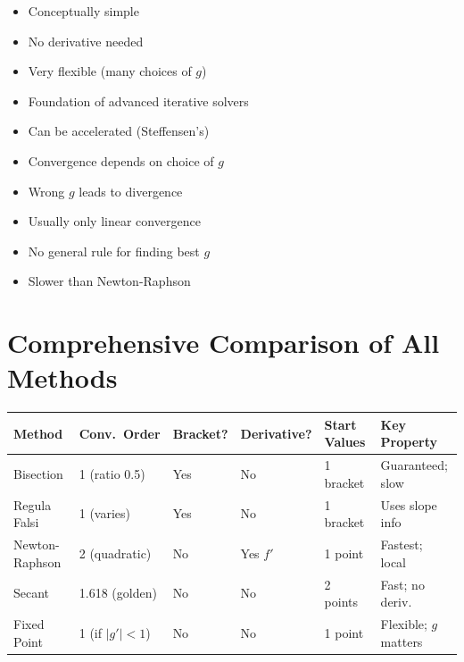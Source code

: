 \documentclass[12pt]{article}
\newcommand{\hcell}[1]{\textbf{\color{white}#1}}
\begin{document}
\bigskip

\begin{multicols}{2}
\begin{prosbox}
\begin{itemize}[noitemsep]
  \item Conceptually simple
  \item No derivative needed
  \item Very flexible (many choices of $g$)
  \item Foundation of advanced iterative solvers
  \item Can be accelerated (Steffensen's)
\end{itemize}
\end{prosbox}

\columnbreak

\begin{consbox}
\begin{itemize}[noitemsep]
  \item Convergence depends on choice of $g$
  \item Wrong $g$ leads to divergence
  \item Usually only linear convergence
  \item No general rule for finding best $g$
  \item Slower than Newton-Raphson
\end{itemize}
\end{consbox}
\end{multicols}

\newpage

\section*{Comprehensive Comparison of All Methods}

\begin{center}
{\footnotesize\setlength{\tabcolsep}{4pt}
\begin{tabular}{p{2.6cm} C{2.2cm} C{1.7cm} C{2cm} C{1.8cm} p{2.8cm}}
\toprule
{}
\hcell{Method} & \hcell{Conv.\ Order} & \hcell{Bracket?} & \hcell{Derivative?} & \hcell{Start Values} & \hcell{Key Property} \\
\midrule
{}
Bisection      & 1 (ratio 0.5)  & Yes & No       & 1 bracket & Guaranteed; slow \\
Regula Falsi   & 1 (varies)     & Yes & No       & 1 bracket & Uses slope info \\
Newton-Raphson & 2 (quadratic)  & No  & Yes $f'$ & 1 point   & Fastest; local \\
Secant         & 1.618 (golden) & No  & No       & 2 points  & Fast; no deriv. \\
Fixed Point    & 1 (if $|g'|<1$) & No & No      & 1 point   & Flexible; $g$ matters \\
\bottomrule
\end{tabular}
}
\end{center}
\end{document}
